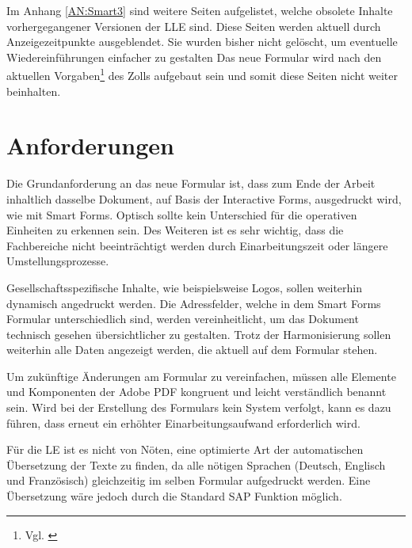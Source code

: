 	Im Anhang \ref{AN:Smart3} sind weitere Seiten aufgelistet, welche obsolete Inhalte vorhergegangener Versionen der \ac{LLE} sind. Diese Seiten werden aktuell durch Anzeigezeitpunkte ausgeblendet. Sie wurden bisher nicht gelöscht, um eventuelle Wiedereinführungen einfacher zu gestalten
	Das neue Formular wird nach den aktuellen Vorgaben\footnote{Vgl. \cite{ZOLL.2017}} des Zolls aufgebaut sein und somit diese Seiten nicht weiter beinhalten.
	
	
	\FloatBarrier
	\section{Anforderungen}
	\label{ch:Anf}
		Die Grundanforderung an das neue Formular ist, dass zum Ende der Arbeit inhaltlich dasselbe Dokument, auf Basis der Interactive Forms, ausgedruckt wird, wie mit Smart Forms. Optisch sollte kein Unterschied für die operativen Einheiten zu erkennen sein. Des Weiteren ist es sehr wichtig, dass die Fachbereiche nicht beeinträchtigt werden durch Einarbeitungszeit oder längere Umstellungsprozesse. 
	
		Gesellschaftsspezifische Inhalte, wie beispielsweise Logos, sollen weiterhin dynamisch angedruckt werden.
		Die Adressfelder, welche in dem Smart Forms Formular unterschiedlich sind, werden vereinheitlicht, um das Dokument technisch gesehen übersichtlicher zu gestalten. Trotz der Harmonisierung sollen weiterhin alle Daten angezeigt werden, die aktuell auf dem Formular stehen. 
		
		Um zukünftige Änderungen am Formular zu vereinfachen, müssen alle Elemente und Komponenten der Adobe \ac{PDF} kongruent und leicht verständlich benannt sein. Wird bei der Erstellung des Formulars kein System verfolgt, kann es dazu führen, dass erneut ein erhöhter Einarbeitungsaufwand erforderlich wird.
		
		Für die \ac{LE} ist es nicht von Nöten, eine optimierte Art der automatischen Übersetzung der Texte zu finden, da alle nötigen Sprachen (Deutsch, Englisch und Französisch) gleichzeitig im selben Formular aufgedruckt werden. Eine Übersetzung wäre jedoch durch die Standard SAP Funktion möglich.
		

